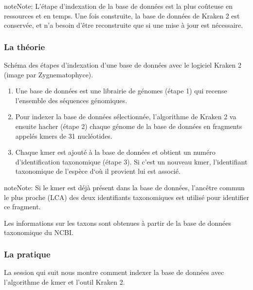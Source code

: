 \documentclass[letterpaper,10pt,french]{sphinxmanual}
\let\sphinxpxdimen\pdfpxdimen\else\newdimen\sphinxpxdimen
\begin{document}
\begin{sphinxadmonition}{note}{Note:}
L’étape d’indexation de la base de données est la plus coûteuse en ressources et en temps. Une fois construite, la base de données de Kraken 2 est conservée, et n’a besoin d’être reconstruite que si une mise à jour est nécessaire.
\end{sphinxadmonition}


\subsubsection{La théorie}
\label{\detokenize{tutorial:la-theorie}}
\noindent{\hspace*{\fill}\sphinxincludegraphics[width=400\sphinxpxdimen]{{indexation_kraken_2}.png}}

Schéma des étapes d’indexation d’une base de données avec le logiciel Kraken 2 (image par Zygnematophyce).
\begin{enumerate}
%
\item {} 
Une base de données est une librairie de génomes (étape 1) qui recense l’ensemble des séquences génomiques.

\item {} 
Pour indexer la base de données sélectionnée, l’algorithme de Kraken 2 va ensuite hacher (étape 2) chaque génome de la base de données en fragments appelés k\sphinxhyphen{}mers de 31 nucléotides.

\item {} 
Chaque k\sphinxhyphen{}mer est ajouté à la base de données et obtient un numéro d’identification taxonomique (étape 3). Si c’est un nouveau k\sphinxhyphen{}mer, l’identifiant taxonomique de l’espèce d‘où il provient lui est associé.

\end{enumerate}

\begin{sphinxadmonition}{note}{Note:}
Si le k\sphinxhyphen{}mer est déjà présent dans la base de données, l’ancêtre commun le plus proche (LCA) des deux identifiants taxonomiques est utilisé pour identifier ce fragment.
\end{sphinxadmonition}




Les informations sur les taxons sont obtenues à partir de la base de données taxonomique du NCBI.




\subsubsection{La pratique}
\label{\detokenize{tutorial:la-pratique}}
La session qui suit nous montre comment indexer la base de données avec l’algorithme de k\sphinxhyphen{}mer et l’outil Kraken 2.
\end{document}
